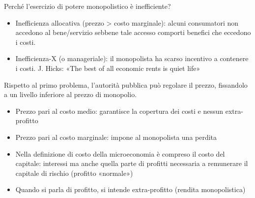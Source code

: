 \documentclass[aspectratio=64,12pt]{beamer}
\begin{document}
\begin{frame}{Perché l'esercizio di potere monopolistico è inefficiente?}
\begin{itemize}
\item \alert{Inefficienza allocativa} (prezzo > costo marginale): alcuni
  consumatori non accedono al bene/servizio sebbene tale accesso comporti
  benefici che eccedono i costi.
\item \alert{Inefficienza-X} (o manageriale): il monopolista ha scarso incentivo a
contenere i costi. J. Hicks: «The best of all economic rents is quiet life»
\end{itemize}

Rispetto al primo problema, l'autorità pubblica può \alert{regolare il prezzo}, fissandolo a un livello inferiore al prezzo di monopolio.
\begin{itemize}
\item Prezzo pari al \alert{costo medio}: garantisce la copertura dei costi e nessun
extra-profitto
\item Prezzo pari al \alert{costo marginale}: impone al monopolista una perdita
\end{itemize}
\begin{block}{}
  \small
\begin{itemize}
\item Nella definizione di costo della microeconomia è compreso il \alert{costo del
capitale}: interessi ma anche quella parte di profitti necessaria a remunerare
il capitale di rischio (profitto «normale»)
\item Quando si parla di profitto, si intende extra-profitto (rendita monopolistica)
\end{itemize}
\end{block}
\end{frame}
\end{document}
